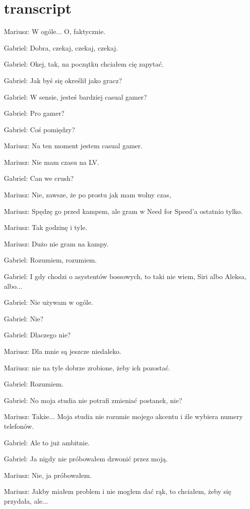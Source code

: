 
\section{transcript}

Mariusz: W ogóle... O, faktycznie.

Gabriel: Dobra, czekaj, czekaj, czekaj.

Gabriel: Okej, tak, na początku chciałem cię zapytać.

Gabriel: Jak byś się określił jako gracz?

Gabriel: W sensie, jesteś bardziej casual gamer?

Gabriel: Pro gamer?

Gabriel: Coś pomiędzy?

Mariusz: Na ten moment jestem casual gamer.

Mariusz: Nie mam czasu na LV.

Gabriel: Can we crush?

Mariusz: Nie, zawsze, że po prostu jak mam wolny czas,

Mariusz: Spędzę go przed kampem, ale gram w Need for Speed'a ostatnio tylko.

Mariusz: Tak godzinę i tyle.

Mariusz: Dużo nie gram na kampy.

Gabriel: Rozumiem, rozumiem.

Gabriel: I gdy chodzi o asystentów bossowych, to taki nie wiem, Siri albo Aleksa, albo...

Gabriel: Nie używam w ogóle.

Gabriel: Nie?

Gabriel: Dlaczego nie?

Mariusz: Dla mnie są jeszcze niedaleko.

Mariusz: nie na tyle dobrze zrobione, żeby ich pozostać.

Gabriel: Rozumiem.

Gabriel: No moja studia nie potrafi zmieniać postanek, nie?

Mariusz: Także... Moja studia nie rozumie mojego akcentu i źle wybiera numery telefonów.

Gabriel: Ale to już ambitnie.

Gabriel: Ja nigdy nie próbowałem dzwonić przez moją.

Mariusz: Nie, ja próbowałem.

Mariusz: Jakby miałem problem i nie mogłem dać rąk, to chciałem, żeby się przydała, ale...

